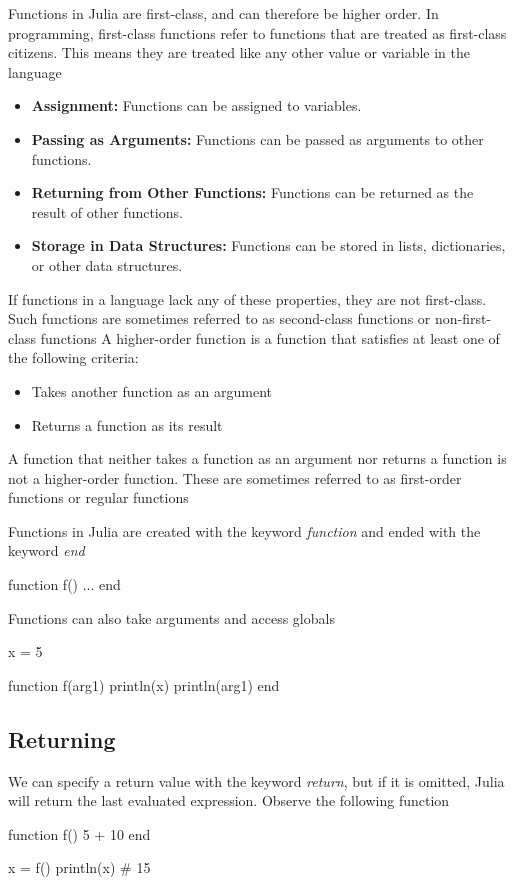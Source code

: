 \documentclass{report}
\begin{document}
    \pagebreak 
    \bigbreak \noindent 
    Functions in Julia are first-class, and can therefore be higher order. In programming, first-class functions refer to functions that are treated as first-class citizens. This means they are treated like any other value or variable in the language
    \begin{itemize}
        \item \textbf{Assignment:} Functions can be assigned to variables.
        \item \textbf{Passing as Arguments:} Functions can be passed as arguments to other functions.
        \item \textbf{Returning from Other Functions:} Functions can be returned as the result of other functions.
        \item \textbf{Storage in Data Structures:} Functions can be stored in lists, dictionaries, or other data structures.
    \end{itemize}
    If functions in a language lack any of these properties, they are not first-class. Such functions are sometimes referred to as second-class functions or non-first-class functions
    \bigbreak \noindent 
    A higher-order function is a function that satisfies at least one of the following criteria:
    \begin{itemize}
        \item Takes another function as an argument
        \item Returns a function as its result
    \end{itemize}
    \bigbreak \noindent 
    A function that neither takes a function as an argument nor returns a function is not a higher-order function. These are sometimes referred to as first-order functions or regular functions


    \bigbreak \noindent 
    Functions in Julia are created with the keyword \textit{function} and ended with the keyword \textit{end}
    \bigbreak \noindent 
    \begin{jlcode}
    function f()
        ...
    end
    \end{jlcode}
    \bigbreak \noindent 
    Functions can also take arguments and access globals
    \bigbreak \noindent 
    \begin{jlcode}
        x = 5

        function f(arg1)
            println(x)
            println(arg1)
        end
    \end{jlcode}
    \bigbreak \noindent 
    \subsection{Returning}
    \bigbreak \noindent 
    We can specify a return value with the keyword \textit{return}, but if it is omitted, Julia will return the last evaluated expression. Observe the following function
    \bigbreak \noindent 
    \begin{jlcode}
        function f()
            5 + 10
        end

        x = f()
        println(x) # 15
    \end{jlcode}
    \bigbreak \noindent 
\end{document}
